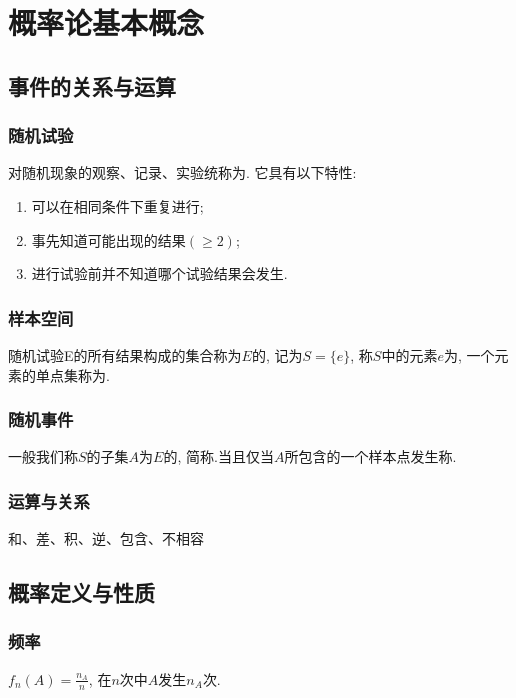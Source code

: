 \newpage
\section{概率论基本概念}
\subsection{事件的关系与运算}
\subsubsection{随机试验}
对随机现象的观察、记录、实验统称为. 它具有以下特性: 
\begin{enumerate}
    \item 可以在相同条件下重复进行; 
    \item 事先知道可能出现的结果$(\ge 2)$; 
    \item 进行试验前并不知道哪个试验结果会发生.  
\end{enumerate}

\subsubsection{样本空间}
\begin{definition}
    随机试验E的所有结果构成的集合称为$E$的, 记为$S=\{e\}$, 称$S$中的元素$e$为, 一个元素的单点集称为.
\end{definition}

\subsubsection{随机事件}
一般我们称$S$的子集$A$为$E$的, 简称.当且仅当$A$所包含的一个样本点发生称. 

\subsubsection{运算与关系}
和、差、积、逆、包含、不相容

\subsection{概率定义与性质}
\subsubsection{频率}
\begin{definition}
    $f_n(A)=\frac{n_A}{n}$, 在$n$次中$A$发生$n_A$次. 
\end{definition}

